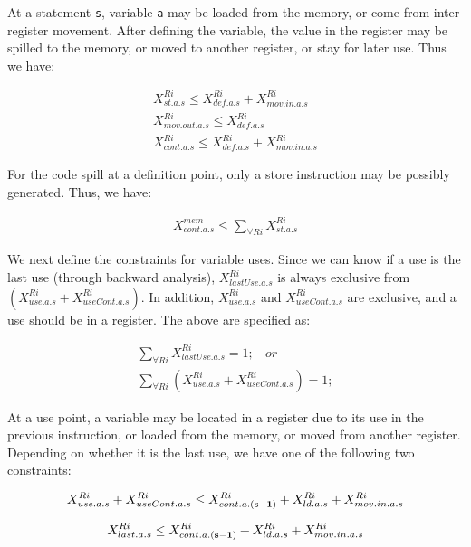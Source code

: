 At a statement {\tt s}, variable {\tt a} may be loaded from the
memory, or come from inter-register movement. After defining the
variable, the value in the register may be spilled to the memory, or
moved to another register, or stay for later use. Thus we have:

\begin{small}
\begin{eqnarray}
X_{st.a.s}^{Ri} \leq X_{def.a.s}^{Ri} + X_{mov.in.a.s}^{Ri} \nonumber \\
X_{mov.out.a.s}^{Ri} \leq X_{def.a.s}^{Ri}  \nonumber \\
X_{cont.a.s}^{Ri} \leq X_{def.a.s}^{Ri} + X_{mov.in.a.s}^{Ri} 
\end{eqnarray}
\end{small}

For the code spill at a definition point, only a store instruction may
be possibly generated. Thus, we have:

\begin{small}
\begin{eqnarray}
X_{cont.a.s}^{mem} \leq \sum_{\forall Ri}X_{st.a.s}^{Ri}
\end{eqnarray}
\end{small}

We next define the constraints for variable uses. Since we can know if
a use is the last use (through backward analysis),
$X_{lastUse.a.s}^{Ri}$ is always exclusive from
$(X_{use.a.s}^{Ri}+X_{useCont.a.s}^{Ri})$. In addition,
$X_{use.a.s}^{Ri}$ and $X_{useCont.a.s}^{Ri}$ are exclusive, and a use
should be in a register. The above are specified as:

\begin{small}
\begin{eqnarray}
\sum_{\forall Ri} X_{lastUse.a.s}^{Ri} = 1;  ~~~~or \nonumber \\
\sum_{\forall Ri} (X_{use.a.s}^{Ri} + X_{useCont.a.s}^{Ri}) = 1;
\end{eqnarray}
\end{small}

At a use point, a variable may be located in a register due to its use in the
previous instruction, or loaded from the memory, or moved
from another register. Depending on whether it is the last use, we
have one of the following two constraints:

\begin{small}
\begin{eqnarray}
X_{use.a.s}^{Ri} + X_{useCont.a.s}^{Ri} \leq X_{cont.a.{\bf(s-1)}}^{Ri} + X_{ld.a.s}^{Ri} + X_{mov.in.a.s}^{Ri} \nonumber 
\end{eqnarray}
\end{small}
\vspace{-0.1in}
\begin{small}
\begin{eqnarray}X_{last.a.s}^{Ri} \leq X_{cont.a.{\bf(s-1)}}^{Ri} + X_{ld.a.s}^{Ri} + X_{mov.in.a.s}^{Ri} 
\end{eqnarray}
\end{small}

